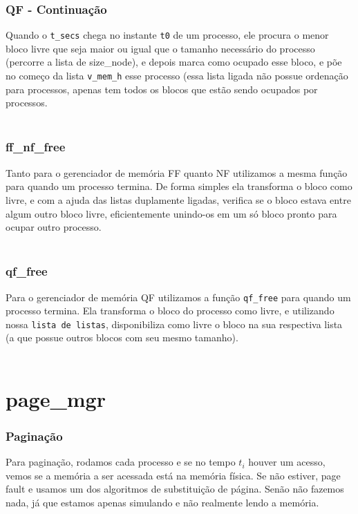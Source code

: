 \documentclass{beamer}
\begin{document}

\begin{frame}
  \frametitle{QF - Continuação}
  Quando o \texttt{t\_secs} chega no instante \texttt{t0} de um processo, ele procura o menor bloco livre que seja maior ou igual que o tamanho necessário do processo (percorre a lista de size\_node), e depois marca como ocupado esse bloco, e põe no começo da lista \texttt{v\_mem\_h} esse processo (essa lista ligada não possue ordenação para processos, apenas tem todos os blocos que estão sendo ocupados por processos.\\~\\

\end{frame}


\begin{frame}
  \frametitle{ff\_nf\_free}
  Tanto para o gerenciador de memória FF quanto NF utilizamos a mesma função para quando um processo termina. De forma simples ela transforma o bloco como livre, e com a ajuda das listas duplamente ligadas,
  verifica se o bloco estava entre algum outro bloco livre, eficientemente unindo-os em um só bloco pronto para ocupar outro processo.\\~\\

\end{frame}


\begin{frame}
  \frametitle{qf\_free}
  Para o gerenciador de memória QF utilizamos a função \texttt{qf\_free} para quando um processo termina. Ela transforma o bloco do processo como livre, e utilizando nossa \texttt{lista de listas}, disponibiliza como livre o bloco na sua respectiva lista (a que possue outros blocos com seu mesmo tamanho).\\~\\

\end{frame}

\section{page\_mgr}

\begin{frame}
  \frametitle{Paginação}
  Para paginação, rodamos cada processo e se no tempo $t_i$ houver um acesso, vemos se a memória a
  ser acessada está na memória física. Se não estiver, page fault e usamos um dos algoritmos de
  substituição de página. Senão não fazemos nada, já que estamos apenas simulando e não realmente
  lendo a memória.
\end{frame}
\end{document}
